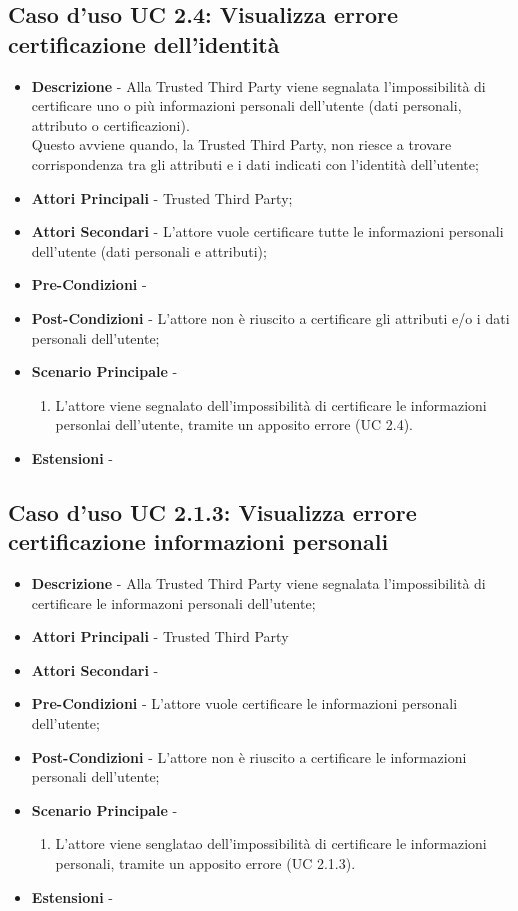 \subsection{Caso d'uso UC 2.4: Visualizza errore certificazione dell'identità}
\begin{itemize}
	\item \textbf{Descrizione} - Alla Trusted Third Party viene segnalata l'impossibilità di certificare uno o più informazioni personali dell'utente (dati personali, attributo o certificazioni).\\
	Questo avviene quando, la Trusted Third Party, non riesce a trovare corrispondenza tra gli attributi e i dati indicati con l'identità dell'utente;
	\item \textbf{Attori Principali} - Trusted Third Party;
	\item \textbf{Attori Secondari} - L'attore vuole certificare tutte le informazioni personali dell'utente (dati personali e attributi);
	\item \textbf{Pre-Condizioni} -
	\item \textbf{Post-Condizioni} - L'attore non è riuscito a certificare gli attributi e/o i dati personali dell'utente;
	\item \textbf{Scenario Principale} -
	\begin{enumerate}
		\item L'attore viene segnalato dell'impossibilità di certificare le informazioni personlai dell'utente, tramite un apposito errore (UC 2.4).
	\end{enumerate}
	\item \textbf{Estensioni} -
\end{itemize}
\subsection{Caso d'uso UC 2.1.3: Visualizza errore certificazione informazioni personali}
\begin{itemize}
	\item \textbf{Descrizione} - Alla Trusted Third Party viene segnalata l'impossibilità di certificare le informazoni personali dell'utente;
	\item \textbf{Attori Principali} - Trusted Third Party
	\item \textbf{Attori Secondari} -
	\item \textbf{Pre-Condizioni} - L'attore vuole certificare le informazioni personali dell'utente;
	\item \textbf{Post-Condizioni} - L'attore non è riuscito a certificare le informazioni personali dell'utente;
	\item \textbf{Scenario Principale} -
	\begin{enumerate}
		\item L'attore viene senglatao dell'impossibilità di certificare le informazioni personali, tramite un apposito errore (UC 2.1.3).
	\end{enumerate}
	\item \textbf{Estensioni} -
\end{itemize}
